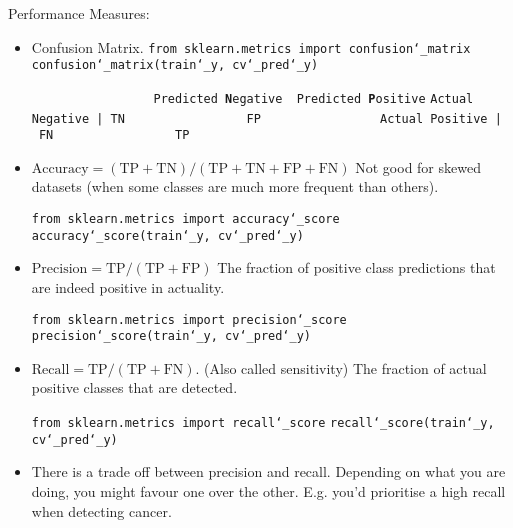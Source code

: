 Performance Measures:
\vspace{-3.0mm}
\begin{itemize}

\item
Confusion Matrix.\newline
\texttt{from sklearn.metrics import confusion\char`_matrix}\newline
\texttt{confusion\char`_matrix(train\char`_y, cv\char`_pred\char`_y)}

\texttt{~~~~~~~~~~~~~~~~~Predicted \textbf{N}egative~~Predicted \textbf{P}ositive}\newline
\texttt{Actual Negative~|~TN~~~~~~~~~~~~~~~~~FP~~~~~~~~~~~~~~~~}\newline
\texttt{Actual Positive~|~FN~~~~~~~~~~~~~~~~~TP~~~~~~~~~~~~~~~~}\newline

\item
$\textrm{Accuracy} = (\textrm{TP}+\textrm{TN}) / (\textrm{TP}+\textrm{TN}+\textrm{FP}+\textrm{FN})$\newline
Not good for skewed datasets (when some classes are much more frequent than others).

\texttt{from sklearn.metrics import accuracy\char`_score}\newline
\texttt{accuracy\char`_score(train\char`_y, cv\char`_pred\char`_y)}\newline

\item
$\textrm{Precision} = \textrm{TP} / (\textrm{TP}+\textrm{FP})$\newline
The fraction of positive class predictions that are indeed positive in actuality.

\texttt{from sklearn.metrics import precision\char`_score}\newline
\texttt{precision\char`_score(train\char`_y, cv\char`_pred\char`_y)}\newline

\item
$\textrm{Recall} = \textrm{TP} / (\textrm{TP}+\textrm{FN})$. (Also called sensitivity)\newline
The fraction of actual positive classes that are detected.

\texttt{from sklearn.metrics import recall\char`_score}\newline
\texttt{recall\char`_score(train\char`_y, cv\char`_pred\char`_y)}\newline

\item
There is a trade off between precision and recall.
Depending on what you are doing, you might favour one over the other.
E.g. you'd prioritise a high recall when detecting cancer.\newline


\end{itemize}
